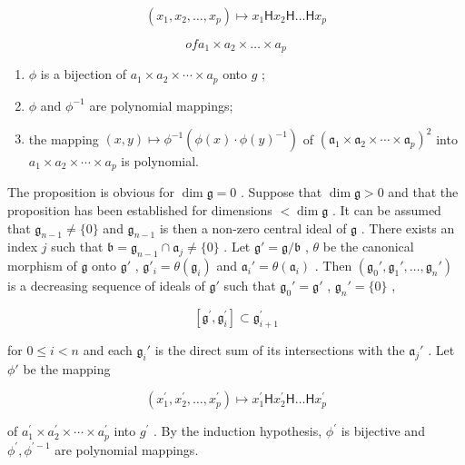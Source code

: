 \[
\left(x _ {1}, x _ {2}, \dots , x _ {p}\right) \mapsto x _ {1} \mathsf {H} x _ {2} \mathsf {H} \dots \mathsf {H} x _ {p}
\]

\[
o f a _ {1} \times a _ {2} \times \dots \times a _ {p}
\]

\begin{enumerate}
\def\labelenumi{(\roman{enumi})}
\item
  \(\phi\) is a bijection of \(a_{1} \times a_{2} \times \cdots \times a_{p}\) onto \(g\) ;
\item
  \(\phi\) and \(\phi^{-1}\) are polynomial mappings;
\item
  the mapping \((x,y)\mapsto\phi^{-1}(\phi(x)\cdot\phi(y)^{-1})\) of \((\mathfrak{a}_{1}\times\mathfrak{a}_{2}\times\cdots\times\mathfrak{a}_{p})^{2}\) into \(a_{1}\times a_{2}\times\cdots\times a_{p}\) is polynomial.
\end{enumerate}

The proposition is obvious for \(\dim \mathfrak{g} = 0\) . Suppose that \(\dim \mathfrak{g} > 0\) and that the proposition has been established for dimensions \(<\dim \mathfrak{g}\) . It can be assumed that \(\mathfrak{g}_{n-1} \neq \{0\}\) and \(\mathfrak{g}_{n-1}\) is then a non-zero central ideal of \(\mathfrak{g}\) . There exists an index \(j\) such that \(\mathfrak{b} = \mathfrak{g}_{n-1} \cap \mathfrak{a}_j \neq \{0\}\) . Let \(\mathfrak{g}' = \mathfrak{g}/\mathfrak{b}\) , \(\theta\) be the canonical morphism of \(\mathfrak{g}\) onto \(\mathfrak{g}'\) , \(\mathfrak{g}'_i = \theta(\mathfrak{g}_i)\) and \(\mathfrak{a}_i' = \theta(\mathfrak{a}_i)\) . Then \((\mathfrak{g}_0', \mathfrak{g}_1', \ldots, \mathfrak{g}_n')\) is a decreasing sequence of ideals of \(\mathfrak{g}'\) such that \(\mathfrak{g}_0' = \mathfrak{g}'\) , \(\mathfrak{g}_n' = \{0\}\) ,

\[
[ \mathfrak {g} ^ {\prime}, \mathfrak {g} _ {i} ^ {\prime} ] \subset \mathfrak {g} _ {i + 1} ^ {\prime}
\]

for \(0 \leqslant i < n\) and each \(\mathfrak{g}_i'\) is the direct sum of its intersections with the \(\mathfrak{a}_j'\) . Let \(\phi'\) be the mapping

\[
\left(x _ {1} ^ {\prime}, x _ {2} ^ {\prime}, \dots , x _ {p} ^ {\prime}\right) \mapsto x _ {1} ^ {\prime} \mathsf {H} x _ {2} ^ {\prime} \mathsf {H} \dots \mathsf {H} x _ {p} ^ {\prime}
\]

of \(a_{1}^{\prime} \times a_{2}^{\prime} \times \cdots \times a_{p}^{\prime}\) into \(g^{\prime}\) . By the induction hypothesis, \(\phi^{\prime}\) is bijective and \(\phi^{\prime}, \phi^{\prime-1}\) are polynomial mappings.

